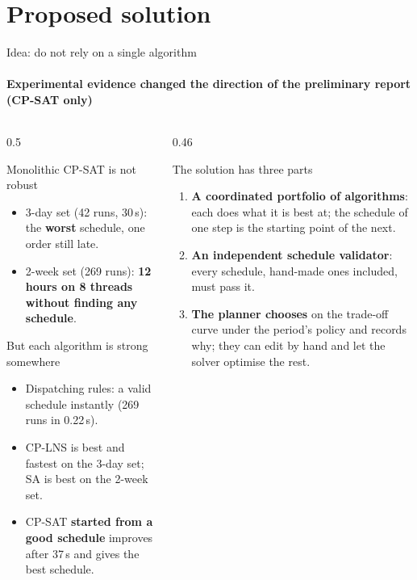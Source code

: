 \section{Proposed solution}

\begin{frame}{Idea: do not rely on a single algorithm}
\framesubtitle{Experimental evidence changed the direction of the preliminary report (CP-SAT only)}
\begin{columns}[T]
\begin{column}{0.5\textwidth}
\begin{alertblock}{Monolithic CP-SAT is not robust}
\scriptsize
\begin{itemize}\setlength{\itemsep}{0.2em}
  \item 3-day set (42 runs, 30\,s): the \textbf{worst} schedule, one order still late.
  \item 2-week set (269 runs): \textbf{12 hours on 8 threads without finding any schedule}.
\end{itemize}
\end{alertblock}
\vspace{-0.2em}
\begin{exampleblock}{But each algorithm is strong somewhere}
\scriptsize
\begin{itemize}\setlength{\itemsep}{0.2em}
  \item Dispatching rules: a valid schedule instantly (269 runs in 0.22\,s).
  \item CP-LNS is best and fastest on the 3-day set; SA is best on the 2-week set.
  \item CP-SAT \textbf{started from a good schedule} improves after 37\,s and gives the best schedule.
\end{itemize}
\end{exampleblock}
\end{column}
\begin{column}{0.46\textwidth}
\begin{block}{The solution has three parts}
\scriptsize
\begin{enumerate}\setlength{\itemsep}{0.35em}
  \item \textbf{A coordinated portfolio of algorithms}: each does what it is best at; the schedule of one step
        is the starting point of the next.
  \item \textbf{An independent schedule validator}: every schedule, hand-made ones included, must pass it.
  \item \textbf{The planner chooses} on the trade-off curve under the period's policy and records why;
        they can edit by hand and let the solver optimise the rest.
\end{enumerate}
\end{block}
\end{column}
\end{columns}
\end{frame}

